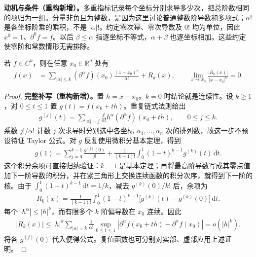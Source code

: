 \documentclass[../../main.tex]{subfiles}
\begin{document}
\begin{remark}
\textbf{动机与条件（重构新增）。}多重指标记录每个坐标分别求导多少次，把总阶数相同的项归为一组。分量非负且为整数，是因为这里讨论普通整数阶导数和多项式；$\alpha!$ 是各坐标阶乘的乘积，不是 $|\alpha|!$。约定零次幂、零次导数及 $0!$ 均为单位，因此 $x^0=1$、$\partial^0f=f$。以后 $\beta\leqslant\alpha$ 指逐坐标不等式，$\alpha+\beta$ 也逐坐标相加。这些约定使零阶和常数情形无需排除。
\end{remark}
\begin{theorem}\label{theorem:ch08-taylor-formula}
若 $f\in C^k$，则在任意 $x_0\in\mathbb R^n$ 处有
\begin{align*}
f(x)&=\sum_{|\alpha|\leqslant k}(\partial^\alpha f)(x_0)
\frac{(x-x_0)^\alpha}{\alpha!}+R_k(x),\qquad
\lim_{x\to x_0}\frac{|R_k(x)|}{|x-x_0|^k}=0.
\end{align*}
\end{theorem}
\begin{proof}
\textbf{完整补写（重构新增）。}置 $h=x-x_0$。$k=0$ 时结论就是连续性。设 $k\geqslant1$，对 $0\leqslant t\leqslant1$ 置 $g(t)=f(x_0+th)$。重复链式法则给出
\begin{align*}
g^{(j)}(t)=\sum_{|\alpha|=j}\frac{j!}{\alpha!}h^\alpha
(\partial^\alpha f)(x_0+th),\qquad 0\leqslant j\leqslant k.
\end{align*}
系数 $j!/\alpha!$ 计数 $j$ 次求导时分别选中各坐标 $\alpha_1,\ldots,\alpha_n$ 次的排列数，故这一步不预设待证 Taylor 公式。对 $g$ 反复使用微积分基本定理，得到
\begin{align*}
g(1)=\sum_{j=0}^{k-1}\frac{g^{(j)}(0)}{j!}
+\frac1{(k-1)!}\int_0^1(1-t)^{k-1}g^{(k)}(t)\,\mathrm dt.
\end{align*}
这个积分余项可直接归纳验证：$k=1$ 是基本定理；再将最高阶导数写成其零点值加下一阶导数的积分，并在紧三角形上交换连续函数的积分次序，就得到下一阶的核。由于 $\int_0^1(1-t)^{k-1}\,\mathrm dt=1/k$，减去 $g^{(k)}(0)/k!$ 后，余项为
\begin{align*}
R_k(x)=\frac1{(k-1)!}\int_0^1(1-t)^{k-1}
\bigl[g^{(k)}(t)-g^{(k)}(0)\bigr]\,\mathrm dt.
\end{align*}
每个 $|h^\alpha|\leqslant|h|^k$，而有限多个 $k$ 阶偏导数在 $x_0$ 连续。因此
\begin{align*}
|R_k(x)|\leqslant |h|^k
\sum_{|\alpha|=k}\frac1{\alpha!}
\sup_{0\leqslant t\leqslant1}
|\partial^\alpha f(x_0+th)-\partial^\alpha f(x_0)|
=o(|h|^k).
\end{align*}
将各 $g^{(j)}(0)$ 代入便得公式。复值函数也可分别对实部、虚部应用上述证明。
\end{proof}
\end{document}
